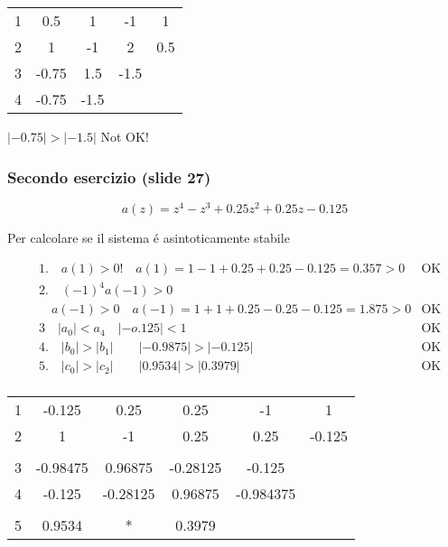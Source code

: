 \documentclass{article}
\begin{document}
\begin{tabular}{c|c c c c}
    1 & 0.5 & 1&  -1 & 1\\
    2 & 1 & -1 & 2 & 0.5\\
    3 & -0.75 & 1.5 & -1.5\\
    4 & -0.75 & -1.5 & &
\end{tabular}

\bigbreak
$|-0.75| > |-1.5|$ Not OK!

\subsubsection{Secondo esercizio (slide 27)}

\[ a(z) = z^4 - z^3 + 0.25 z^2 + 0.25 z - 0.125 \]

Per calcolare se il sistema \'e asintoticamente stabile

\begin{align*}
    &1.\quad  a(1) > 0! \quad a(1) = 1 -1 + 0.25 + 0.25 - 0.125 = 0.357 > 0 & \text{OK}\\
    &2. \quad (-1) ^4 a(-1) > 0 \\
    & \quad a(-1) > 0 \quad a(-1) = 1 + 1 + 0.25 - 0.25 -0.125 = 1.875 > 0 & \text{OK}\\
    &3 \quad |a_0| < a_4 \quad |-o.125| < 1 & \text{OK} \\
    & 4. \quad |b_0| > |b_1| \qquad |-0.9875| > |-0.125| & \text{OK}\\
    & 5.\quad  |c_0| > |c_2| \qquad |0.9534| > |0.3979| & \text{OK}\\
\end{align*}

\begin{tabular}{c|c c c c c}
    1 & -0.125 & 0.25 & 0.25 & -1 & 1\\
    2 & 1 & -1 & 0.25 & 0.25 & -0.125\\
    \\
    3 & -0.98475 & 0.96875 & -0.28125 & -0.125\\
    4 & -0.125 & -0.28125 & 0.96875 & -0.984375\\
    \\
    5 & 0.9534 & * & 0.3979
\end{tabular}
\end{document}

